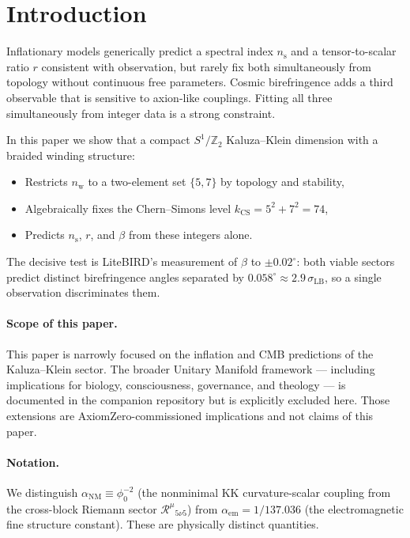 \documentclass[12pt,a4paper]{article}
\newcommand{\nw}{n_{\mathrm{w}}}
\newcommand{\kcs}{k_{\mathrm{CS}}}
\newcommand{\phiz}{\phi_0}
\newcommand{\ns}{n_{\mathrm{s}}}
\newcommand{\aNM}{\alpha_{\mathrm{NM}}}
\newcommand{\aem}{\alpha_{\mathrm{em}}}
\begin{document}
\section{Introduction}
\label{sec:intro}

Inflationary models generically predict a spectral index $\ns$ and a
tensor-to-scalar ratio $r$ consistent with observation, but rarely fix both
simultaneously from topology without continuous free parameters.  Cosmic
birefringence adds a third observable that is sensitive to axion-like couplings.
Fitting all three simultaneously from integer data is a strong constraint.

In this paper we show that a compact $S^1/\mathbb{Z}_2$ Kaluza--Klein dimension
with a braided winding structure:
\begin{itemize}
  \item Restricts $\nw$ to a two-element set $\{5,7\}$ by topology and stability,
  \item Algebraically fixes the Chern--Simons level $\kcs = 5^2+7^2 = 74$,
  \item Predicts $\ns$, $r$, and $\beta$ from these integers alone.
\end{itemize}
The decisive test is LiteBIRD's measurement of $\beta$ to $\pm 0.02^\circ$: both
viable sectors predict distinct birefringence angles separated by
$0.058^\circ\approx 2.9\,\sigma_{\mathrm{LB}}$, so a single observation
discriminates them.

\paragraph{Scope of this paper.}
This paper is narrowly focused on the inflation and CMB predictions of the
Kaluza--Klein sector.  The broader Unitary Manifold framework — including
implications for biology, consciousness, governance, and theology — is
documented in the companion repository
\cite{WalkerPearson2026} but is explicitly excluded here.  Those extensions
are AxiomZero-commissioned implications and not claims of this paper.

\paragraph{Notation.}
We distinguish $\aNM \equiv \phiz^{-2}$ (the nonminimal KK curvature-scalar
coupling from the cross-block Riemann sector $\mathcal{R}^\mu{}_{5\nu5}$) from
$\aem=1/137.036$ (the electromagnetic fine structure constant).
These are physically distinct quantities.
\end{document}
